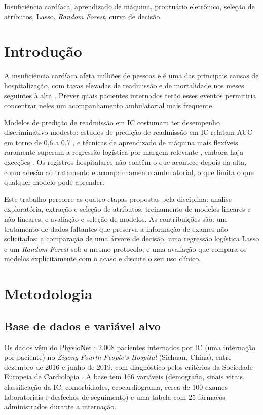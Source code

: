 \documentclass[conference]{IEEEtran}
\begin{document}
\begin{IEEEkeywords}
Insuficiência cardíaca, aprendizado de máquina, prontuário eletrônico, seleção de atributos, Lasso, \textit{Random Forest}, curva de decisão.
\end{IEEEkeywords}

\section{Introdução}

A insuficiência cardíaca afeta milhões de pessoas e é uma das principais causas de hospitalização, com taxas elevadas de readmissão e de mortalidade nos meses seguintes à alta \cite{b4}. Prever quais pacientes internados terão esses eventos permitiria concentrar neles um acompanhamento ambulatorial mais frequente.

Modelos de predição de readmissão em IC costumam ter desempenho discriminativo modesto: estudos de predição de readmissão em IC relatam AUC em torno de 0,6 a 0,7 \cite{b6,b7}, e técnicas de aprendizado de máquina mais flexíveis raramente superam a regressão logística por margem relevante \cite{b6,b8}, embora haja exceções \cite{b7}. Os registros hospitalares não contêm o que acontece depois da alta, como adesão ao tratamento e acompanhamento ambulatorial, o que limita o que qualquer modelo pode aprender.

Este trabalho percorre as quatro etapas propostas pela disciplina: análise exploratória, extração e seleção de atributos, treinamento de modelos lineares e não lineares, e avaliação e seleção de modelos. As contribuições são: um tratamento de dados faltantes que preserva a informação de exames não solicitados; a comparação de uma árvore de decisão, uma regressão logística Lasso e um \textit{Random Forest} sob o mesmo protocolo; e uma avaliação que compara os modelos explicitamente com o acaso e discute o seu uso clínico.

\section{Metodologia}

\subsection{Base de dados e variável alvo}

Os dados vêm do PhysioNet \cite{b1,b3}: 2.008 pacientes internados por IC (uma internação por paciente) no \textit{Zigong Fourth People's Hospital} (Sichuan, China), entre dezembro de 2016 e junho de 2019, com diagnóstico pelos critérios da Sociedade Europeia de Cardiologia \cite{b2,b4}. A base tem 166 variáveis (demografia, sinais vitais, classificação da IC, comorbidades, ecocardiograma, cerca de 100 exames laboratoriais e desfechos de seguimento) e uma tabela com 25 fármacos administrados durante a internação.
\end{document}
